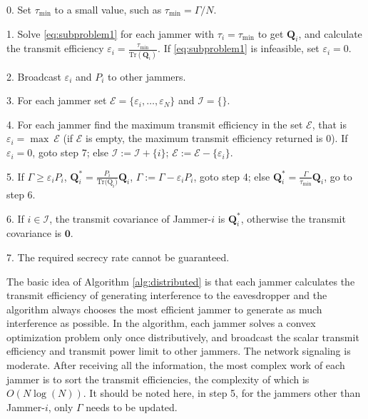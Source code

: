 \documentclass[conference]{IEEEtran}
\begin{document}
\begin{algorithm}
	\caption{}\label{alg:distributed}
	\begin{algorithmic}
		\item[0.] Set $\tau_{\mathrm{min}}$ to a small value, such as $\tau_{\mathrm{min}} = \Gamma/N$. 
		\item[1.] Solve \eqref{eq:subproblem1} for each jammer with $\tau_i = \tau_{\mathrm{min}}$ to get $\mathbf{Q}_i$, and calculate the transmit efficiency $\varepsilon_i = \frac{\tau_{\mathrm{min}}}{\mathrm{Tr}(\mathbf{Q}_i)}$. If \eqref{eq:subproblem1} is infeasible, set $\varepsilon_i = 0$.
		\item[2.] Broadcast $\varepsilon_i$ and $P_i$ to other jammers. 
		\item[3.] For each jammer set $\mathcal{E} =\{ {\varepsilon_i,\ldots, \varepsilon_N}\}$ and $\mathcal{I} =\{\}$.
		\item[4.] For each jammer find the maximum transmit efficiency in the set $\mathcal{E}$, that is $\varepsilon_i = \max~\mathcal{E}$ (if $\mathcal{E}$ is empty,  the maximum transmit efficiency returned is 0). If $\varepsilon_i = 0$, goto step 7; else $\mathcal{I} := \mathcal{I} + \{i\}$; $\mathcal{E} := \mathcal{E}  - \{\varepsilon_i\}$.
		\item[5.] If $\Gamma \geq \varepsilon_{i} P_i$, $\mathbf{Q}_{i}^* = \frac{P_i}{\mathrm{Tr(\mathrm{Q}}_i)}\mathbf{Q}_i$, $\Gamma := \Gamma - \varepsilon_iP_i$, goto step 4; else $\mathbf{Q}_{i}^* = \frac{\Gamma}{\tau_\mathrm{min}}\mathbf{Q}_i$, go to step 6.
		\item[6.] If $i \in \mathcal{I}$, the transmit covariance of Jammer-$i$ is $\mathbf{Q}_i^*$, otherwise the transmit covariance is $\mathbf{0}$.
		\item[7.] The required secrecy rate cannot be guaranteed.
	\end{algorithmic}
\end{algorithm}

The basic idea of Algorithm \ref{alg:distributed} is that each jammer calculates the transmit efficiency of generating interference to the eavesdropper and the algorithm always chooses the most efficient jammer to generate as much interference as possible. In the algorithm, each jammer solves a convex optimization problem only once distributively, and broadcast the scalar transmit efficiency and transmit power limit to other jammers. The network signaling is moderate. After receiving all the information, the most complex work of each jammer is to sort the transmit efficiencies, the complexity of which is $O(N\log(N))$. It should be noted here, in step 5, for the jammers other than Jammer-$i$, only $\Gamma$ needs to be updated.
\end{document}
